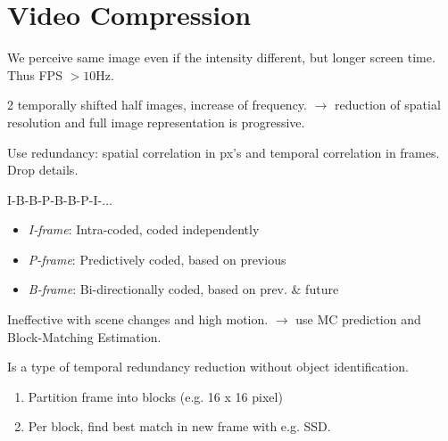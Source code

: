 \section{Video Compression}

\begin{definition}
  We perceive same image even if the intensity different, but longer screen time. Thus FPS \(> 10 \text{Hz}\).
\end{definition}

\begin{definition}
  2 temporally shifted half images, increase of frequency. \(\to\) reduction of spatial resolution and full image representation is progressive.
\end{definition}

\begin{definition}
  Use redundancy: spatial correlation in px's and temporal correlation in frames. Drop details.
\end{definition}

\begin{algorithm}
  I-B-B-P-B-B-P-I-\(\ldots\)
  \begin{itemize}
    \item \textit{I-frame}: Intra-coded, coded independently
    \item \textit{P-frame}: Predictively coded, based on previous
    \item \textit{B-frame}: Bi-directionally coded, based on prev. \& future
  \end{itemize}
\end{algorithm}

\begin{theorem}
  Ineffective with scene changes and high motion. \(\to\) use MC prediction and Block-Matching Estimation.
\end{theorem}

\begin{algorithm}
  Is a type of temporal redundancy reduction without object identification.

  \begin{enumerate}
    \item Partition frame into blocks (e.g. 16 x 16 pixel)
    \item Per block, find best match in new frame with e.g. SSD.
  \end{enumerate}
\end{algorithm}

